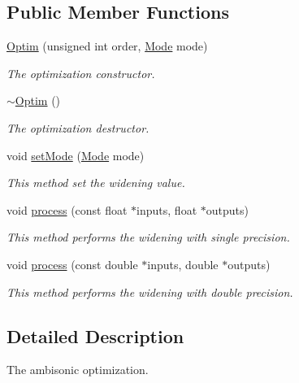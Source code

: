 \subsection*{Public Member Functions}
\begin{DoxyCompactItemize}
\item 
\hyperlink{class_hoa2_d_1_1_optim_a5e11da74b3e87ad15db6538d31eb3628}{Optim} (unsigned int order, \hyperlink{class_hoa2_d_1_1_optim_ae40f22368cb55699cf19729e37c0aff3}{Mode} mode)
\begin{DoxyCompactList}\small\item\em The optimization constructor. \end{DoxyCompactList}\item 
\hyperlink{class_hoa2_d_1_1_optim_a71b6d88873b054944db6efd2713bf8d3}{$\sim$\-Optim} ()
\begin{DoxyCompactList}\small\item\em The optimization destructor. \end{DoxyCompactList}\item 
void \hyperlink{class_hoa2_d_1_1_optim_a2ea2227817c133aeaf2732880d8214ce}{set\-Mode} (\hyperlink{class_hoa2_d_1_1_optim_ae40f22368cb55699cf19729e37c0aff3}{Mode} mode)
\begin{DoxyCompactList}\small\item\em This method set the widening value. \end{DoxyCompactList}\item 
void \hyperlink{class_hoa2_d_1_1_optim_afca15242cbca4fefe08c6f17d2b42241}{process} (const float $\ast$inputs, float $\ast$outputs)
\begin{DoxyCompactList}\small\item\em This method performs the widening with single precision. \end{DoxyCompactList}\item 
void \hyperlink{class_hoa2_d_1_1_optim_ac0c905a79204c921568952c787376120}{process} (const double $\ast$inputs, double $\ast$outputs)
\begin{DoxyCompactList}\small\item\em This method performs the widening with double precision. \end{DoxyCompactList}\end{DoxyCompactItemize}


\subsection{Detailed Description}
The ambisonic optimization. 

